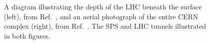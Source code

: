 \begin{figure}[htb]
    \centering
    \quad
    \caption{
        A diagram illustrating the depth of the LHC beneath the surface (left), from Ref.~\cite{Servicegraphique:1708849}, and an aerial photograph of the entire CERN complex (right), from Ref.~\cite{Maximilien:1295244}. 
        The SPS and LHC tunnels illustrated in both figures. 
    }
    \label{fig:lhc_depth}
\end{figure}

